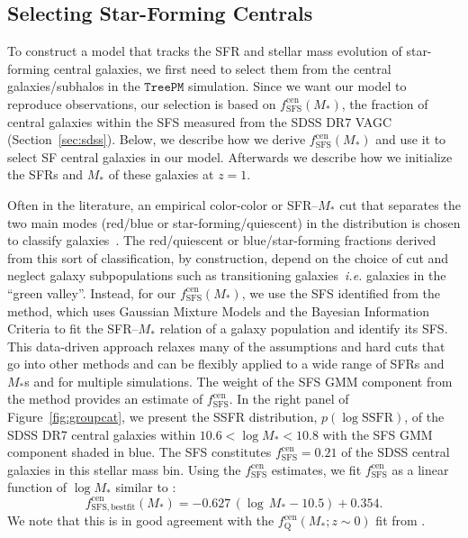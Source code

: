 \documentclass[12pt, letterpaper, preprint, tighten]{aastex62}
\newcommand{\beq}{\begin{equation}}
\newcommand{\eeq}{\end{equation}}
\begin{document}
\subsection{Selecting Star-Forming Centrals}  \label{sec:sfcen}
To construct a model that tracks the SFR and stellar mass evolution of
star-forming central galaxies, we first need to select them from the
central galaxies/subhalos in the $\mathtt{TreePM}$ simulation. Since
we want our model to reproduce observations, our selection is based
on $f^\mathrm{cen}_\mathrm{SFS}(M_*)$, the fraction of central galaxies
within the SFS measured from the SDSS DR7 VAGC (Section~\ref{sec:sdss}).
Below, we describe how we derive $f^\mathrm{cen}_\mathrm{SFS}(M_*)$ and
use it to select SF central galaxies in our model. Afterwards
we describe how we initialize the SFRs and $M_*$ of these galaxies at
$z = 1$.

Often in the literature, an empirical color-color or SFR--$M_*$ cut
that separates the two main modes (red/blue or star-forming/quiescent)
in the distribution is chosen to classify
galaxies~\citep[\emph{e.g.}][]{baldry2006, blanton2009, drory2009, peng2010, moustakas2013, hahn2015}.
The red/quiescent or blue/star-forming fractions derived from this sort
of classification, by construction, depend on the choice of cut and
neglect galaxy subpopulations such as transitioning galaxies~\emph{i.e.}
galaxies in the ``green valley''. Instead, for our $f^\mathrm{cen}_\mathrm{SFS}(M_*)$,
we use the SFS identified from the \cite{hahn2018a} method, which uses Gaussian
Mixture Models and the Bayesian Information Criteria to fit the
SFR--$M_*$ relation of a galaxy population and identify its SFS. This
data-driven approach relaxes many of the assumptions and hard cuts that
go into other methods and can be flexibly applied to a wide range of SFRs 
and $M_*$s and for multiple
simulations. The weight of the SFS GMM component from the method provides
an estimate of $f^\mathrm{cen}_\mathrm{SFS}$. In the right panel of
Figure~\ref{fig:groupcat}, we present the SSFR distribution, $p(\log \mathrm{SSFR})$,
of the SDSS DR7 central galaxies within $10.6 < \log M_* < 10.8$ with
the SFS GMM component shaded in blue.
The SFS constitutes $f^\mathrm{cen}_\mathrm{SFS} = 0.21$ of the SDSS
central galaxies in this stellar mass bin. Using the $f^\mathrm{cen}_\mathrm{SFS}$
estimates, we fit $f^\mathrm{cen}_\mathrm{SFS}$ as a linear function of
$\log M_*$ similar to \cite{wetzel2013,hahn2017b}:
\beq \label{eq:f_cen_sfms}
f^\mathrm{cen}_\mathrm{SFS, bestfit}(M_*) = -0.627\,(\log\,M_* - 10.5) + 0.354.
\eeq
We note that this is in good agreement with the $f_\mathrm{Q}^\mathrm{cen}(M_*; z \sim 0)$
fit from \cite{hahn2017b}.
\end{document}
